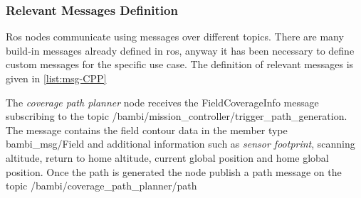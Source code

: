 \subsubsection{Relevant Messages Definition} %
\label{ssub:relevant_messages_definition}
Ros nodes communicate using messages over different topics. There are many build-in messages already defined in \acrshort{ros}, anyway it has been necessary to define custom messages for the specific use case. The definition of relevant messages is given in \autoref{list:msg-CPP}

The \textit{coverage path planner} node receives the \textsf{FieldCoverageInfo} message subscribing to the topic \textsf{/bambi/mission\_controller/trigger\_path\_generation}. The message contains the field contour data in the member type \textsf{bambi\_msg/Field} and additional information such as \textit{sensor footprint}, scanning altitude, return to home altitude, current global position and home global position. Once the path is generated the node publish a \textsf{path} message on the topic \textsf{/bambi/coverage\_path\_planner/path} 

